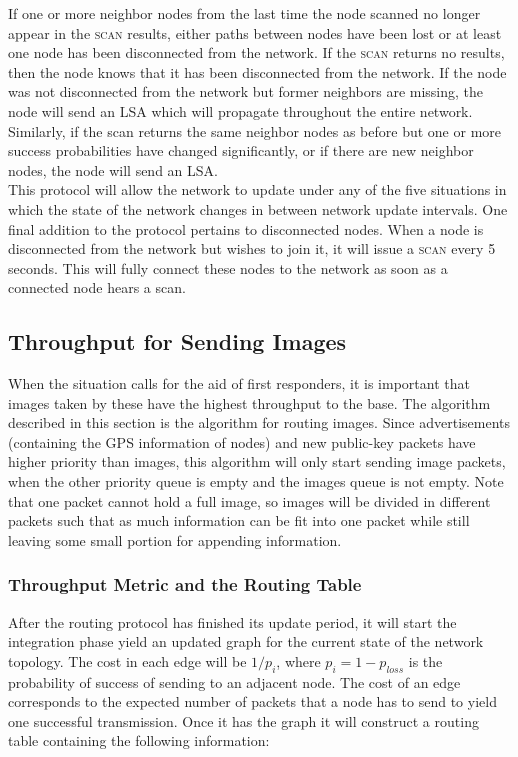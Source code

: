 \documentclass[letterpaper]{article}
\begin{document}
\noindent If one or more neighbor nodes from the last time the node scanned no longer appear in 
the \textsc{scan} results, either paths between nodes have been lost or at least one node has
been disconnected from the network. If the \textsc{scan} returns no results, then the node knows
that it has been disconnected from the network. If the node was not disconnected from the network
but former neighbors are missing, the node will send an LSA which will propagate throughout the
entire network. Similarly, if the scan returns the same neighbor nodes as before but one or more
success probabilities have changed significantly, or if there are new neighbor nodes, the node will
send an LSA.
\\

\noindent This protocol will allow the network to update under any of the five situations in which
the state of the network changes in between network update intervals. One final addition to the
protocol pertains to disconnected nodes. When a node is disconnected from the network but wishes to
join it, it will issue a \textsc{scan} every 5 seconds. This will fully connect these nodes to the
network as soon as a connected node hears a scan. 

\subsection{Throughput for Sending Images}

When the situation calls for the aid of first responders, it is important that images taken by these
have the highest throughput to the base. The algorithm described in this section
is the algorithm for routing images. Since advertisements (containing the GPS information of nodes) and
new public-key packets have higher priority than images, this algorithm will only start sending image
packets, when the other priority queue is empty and the images queue is not empty. Note that one packet
cannot hold a full image, so images will be divided in different packets such that as much
information can be fit into one packet while still leaving some small portion for appending information.

\subsubsection{Throughput Metric and the Routing Table}

After the routing protocol has finished its update period, it will start the integration phase yield an
updated graph for the current state of the network topology. The cost in each edge will be $1/p_{i}$, 
where $p_{i} = 1 - p_{loss}$ is the probability of success of sending to an adjacent node. The cost of an
edge corresponds to the expected number of packets that a node has to send to yield one successful
transmission. Once it has the graph it will construct a routing table containing the following information:
\end{document}
